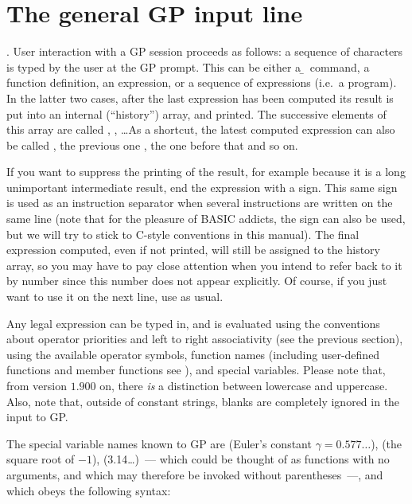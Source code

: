 \section{The general GP input line}
. User interaction with a GP session proceeds as
follows: a sequence of characters is typed by the user at the GP prompt. This
can be either a \b~command, a function definition, an expression, or a
sequence of expressions (i.e.~a program). In the latter two cases, after the
last expression has been computed its result is put into an internal
(``history'') array, and printed. The successive elements of this array are
called , , \dots As a shortcut, the latest computed
expression can also be called \kbd{\%}, the previous one , the one
before that  and so on.

If you want to suppress the printing of the result, for example because it
is a long unimportant intermediate result, end the expression with a
\kbd{;} sign. This same sign is used as an instruction separator when several
instructions are written on the same line (note that for the pleasure of BASIC
addicts, the \kbd{:} sign can also be used, but we will try to stick to
C-style conventions in this manual). The final expression computed, even
if not printed, will still be assigned to the history array, so you may have
to pay close attention when you intend to refer back to it by number since
this number does not appear explicitly. Of course, if you just want to use
it on the next line, use \kbd{\%} as usual.

Any legal expression can be typed in, and is evaluated using the
conventions about operator priorities and left to right associativity (see
the previous section), using the available operator symbols, function names
(including user-defined functions and member functions see
), and special variables. Please note that, from
version $1.900$ on, there \emph{is} a distinction
between lowercase and uppercase. Also, note that, outside of constant
strings, blanks are completely ignored in the input to GP.

The special variable names known to GP are  (Euler's constant
$\gamma=0.577\dots$),  (the square root of $-1$), 
(3.14\dots)~--- which could be thought of as functions with no arguments, and
which may therefore be invoked without parentheses~---, and  which
obeys the following syntax:


